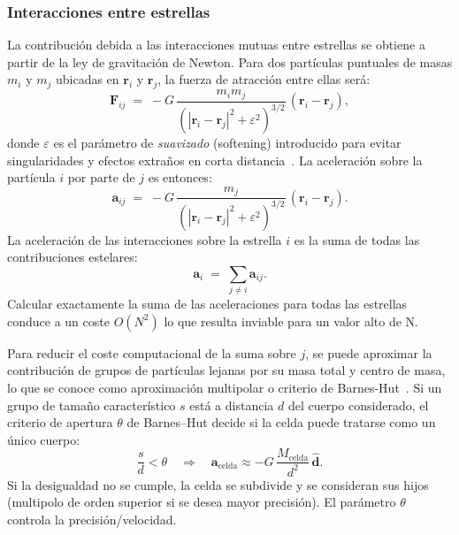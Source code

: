 \subsubsection{Interacciones entre estrellas}
La contribución debida a las interacciones mutuas entre estrellas se obtiene a partir de la ley de gravitación de Newton.
Para dos partículas puntuales de masas \(m_i\) y \(m_j\) ubicadas en \(\mathbf{r}_i\) y \(\mathbf{r}_j\), la fuerza de atracción entre ellas será:
\[
    \mathbf{F}_{ij} \;=\; - G \, \frac{m_i m_j}{(|\mathbf{r}_i-\mathbf{r}_j|^2 + \varepsilon^2)^{3/2}} \, (\mathbf{r}_i - \mathbf{r}_j),
\]
donde \(\varepsilon\) es el parámetro de \emph{suavizado} (softening) introducido para evitar singularidades y efectos extraños en corta distancia~\cite{hockney1988}.
La aceleración sobre la partícula \(i\) por parte de \(j\) es entonces:
\[
    \mathbf{a}_{ij} \;=\; - G \, \frac{m_j}{(|\mathbf{r}_i-\mathbf{r}_j|^2 + \varepsilon^2)^{3/2}} \, (\mathbf{r}_i - \mathbf{r}_j).
\]
La aceleración de las interacciones sobre la estrella \(i\) es la suma de todas las contribuciones estelares:
\[
    \mathbf{a}_i \;=\; \sum_{j\neq i} \mathbf{a}_{ij}.
\]
Calcular exactamente la suma de las aceleraciones para todas las estrellas conduce a un coste \(O(N^2)\) lo que resulta inviable para un valor alto de N.

Para reducir el coste computacional de la suma sobre \(j\), se puede aproximar la contribución de grupos de partículas lejanas por su masa total y centro de masa, lo que se conoce como aproximación multipolar o criterio de Barnes-Hut~\cite{barnes1986}.
Si un grupo de tamaño característico \(s\) está a distancia \(d\) del cuerpo considerado, el criterio de apertura \(\theta\) de Barnes--Hut decide si la celda puede tratarse como un único cuerpo:
\[
    \frac{s}{d} < \theta \quad \Longrightarrow \quad
    \mathbf{a}_{\text{celda}} \approx - G \, \frac{M_{\text{celda}}}{d^2} \,\hat{\mathbf{d}}.
\]
Si la desigualdad no se cumple, la celda se subdivide y se consideran sus hijos (multipolo de orden superior si se desea mayor precisión).
El parámetro \(\theta\) controla la precisión/velocidad.

